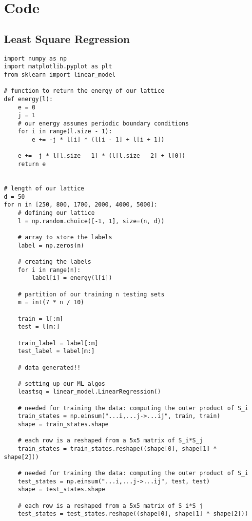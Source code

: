 \appendix
\section{Code}

\subsection{Least Square Regression}

\onecolumn
\begin{verbatim}
import numpy as np
import matplotlib.pyplot as plt
from sklearn import linear_model

# function to return the energy of our lattice
def energy(l):
    e = 0
    j = 1
    # our energy assumes periodic boundary conditions
    for i in range(l.size - 1):
        e += -j * l[i] * (l[i - 1] + l[i + 1])

    e += -j * l[l.size - 1] * (l[l.size - 2] + l[0])
    return e


# length of our lattice
d = 50
for n in [250, 800, 1700, 2000, 4000, 5000]:
    # defining our lattice
    l = np.random.choice([-1, 1], size=(n, d))

    # array to store the labels
    label = np.zeros(n)

    # creating the labels
    for i in range(n):
        label[i] = energy(l[i])

    # partition of our training n testing sets
    m = int(7 * n / 10)

    train = l[:m]
    test = l[m:]

    train_label = label[:m]
    test_label = label[m:]

    # data generated!!

    # setting up our ML algos
    leastsq = linear_model.LinearRegression()

    # needed for training the data: computing the outer product of S_i
    train_states = np.einsum("...i,...j->...ij", train, train)
    shape = train_states.shape

    # each row is a reshaped from a 5x5 matrix of S_i*S_j
    train_states = train_states.reshape((shape[0], shape[1] * shape[2]))

    # needed for training the data: computing the outer product of S_i
    test_states = np.einsum("...i,...j->...ij", test, test)
    shape = test_states.shape

    # each row is a reshaped from a 5x5 matrix of S_i*S_j
    test_states = test_states.reshape((shape[0], shape[1] * shape[2]))


\end{verbatim}

